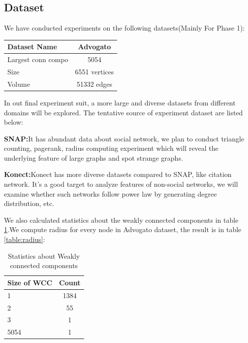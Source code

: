 \subsection{Dataset}
We have conducted experiments on the following datasets(Mainly For Phase 1):
\begin{center}
\begin{tabular}{| l | c |}
  \hline                        
  Dataset Name & Advogato  \\ \hline
  Largest conn compo & 5054  \\ \hline
  Size & 6551 vertices  \\ \hline
  Volume & 51332 edges \\ \hline
\end{tabular}
\end{center}

In out final experiment suit, a more large and diverse datasets from different domains will be explored. The tentative source of experiment dataset are listed below:
\begin{description}
	\item{{\bf SNAP:}}{It has abundant data about social network, we plan to conduct triangle counting, pagerank, radius computing experiment which will reveal the underlying feature of large graphs and spot strange graphs.}
	\item{{\bf Konect:}}{Konect has more diverse datasets compared to SNAP, like citation network. It's a good target to analyze features of non-social networks, we will examine whether such networks follow power law by generating degree distribution, etc.}
\end{description}

We also calculated statistics about the weakly connected components in table \ref{table:wcc}.We compute radius for every node in Advogato dataset, the result is in table \ref{table:radius}:















\begin{table}
\begin{center}
\begin{tabular}{| l | c |}
  \hline                        
  Size of WCC & Count  \\ \hline
  1 & 1384  \\ \hline
  2 & 55  \\ \hline
  3 & 1 \\ \hline
  5054 & 1 \\ \hline  
\end{tabular}
\caption{Statistics about Weakly connected components}
\label{table:wcc}
\end{center}
\end{table}

